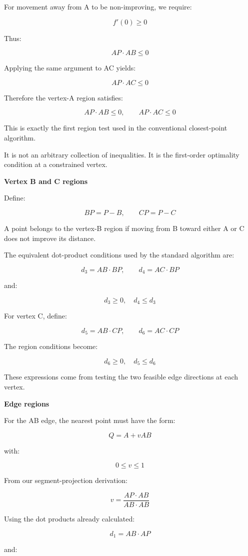For movement away from A to be non-improving, we require:

\[
f'(0)\ge0
\]

Thus:

\[
AP\cdot AB\le0
\]

Applying the same argument to AC yields:

\[
AP\cdot AC\le0
\]

Therefore the vertex-A region satisfies:

\[
\boxed{ AP\cdot AB\le0,\qquad AP\cdot AC\le0 }
\]

This is exactly the first region test used in the conventional closest-point algorithm.

It is not an arbitrary collection of inequalities. It is the first-order optimality condition at a constrained vertex.

\textbf{Vertex B and C regions}

Define:

\[
BP=P-B,\qquad CP=P-C
\]

A point belongs to the vertex-B region if moving from B toward either A or C does not improve its distance.

The equivalent dot-product conditions used by the standard algorithm are:

\[
d_3=AB\cdot BP,\qquad d_4=AC\cdot BP
\]

and:

\[
\boxed{d_3\ge0,\quad d_4\le d_3}
\]

For vertex C, define:

\[
d_5=AB\cdot CP,\qquad d_6=AC\cdot CP
\]

The region conditions become:

\[
\boxed{d_6\ge0,\quad d_5\le d_6}
\]

These expressions come from testing the two feasible edge directions at each vertex.

\textbf{Edge regions}

For the AB edge, the nearest point must have the form:

\[
Q=A+vAB
\]

with:

\[
0\le v\le1
\]

From our segment-projection derivation:

\[
v=\frac{AP\cdot AB}{AB\cdot AB}
\]

Using the dot products already calculated:

\[
d_1=AB\cdot AP
\]

and:

